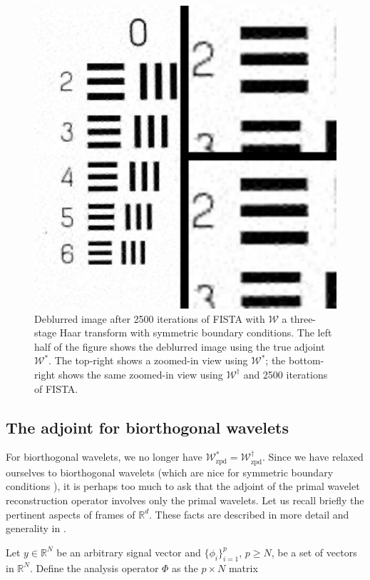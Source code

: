 \documentclass[journal]{IEEEtran}
\newcommand{\reals}{\mathbb{R}}
\begin{document}
\begin{figure}
   \centering
   \includegraphics[width=0.8\columnwidth]{fig2.pdf}
   \caption{Deblurred image after 2500 iterations of FISTA with $\mathcal{W}$ a three-stage Haar transform with symmetric boundary conditions.  The left half of the figure shows the deblurred image using the true adjoint $\mathcal{W}^\ast$.  The top-right shows a zoomed-in view using $\mathcal{W}^\ast$; the bottom-right shows the same zoomed-in view using $\mathcal{W}^\dagger$ and 2500 iterations of FISTA.}
   \label{fig:compare_db1_sym}
\end{figure}


\subsection{The adjoint for biorthogonal wavelets}
For biorthogonal wavelets, we no longer have $\mathcal{W}_\text{zpd}^\ast=\mathcal{W}_\text{zpd}^\dagger$.  Since we have relaxed ourselves to biorthogonal wavelets (which are nice for symmetric boundary conditions \cite{rout_2003}), it is perhaps too much to ask that the adjoint of the primal wavelet reconstruction operator involves only the primal wavelets.  Let us recall briefly the pertinent aspects of frames of $\reals^d$.  These facts are described in more detail and generality in \cite{mallat_2009}.

Let $y\in\reals^N$ be an arbitrary signal vector and $\{\phi_i\}_{i=1}^p$, $p\ge N$, be a set of vectors in $\reals^N$.  Define the analysis operator $\Phi$ as the $p\times N$ matrix
\end{document}
